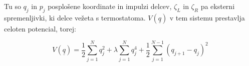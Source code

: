 \documentclass[a4paper]{article}
\newcommand{\half}{\frac{1}{2}}
\newcommand{\q}{\underline{q}}
\begin{document}
    Tu so $q_j$ in $p_j$ posplošene koordinate in impulzi delcev, $\zeta_L$ in $\zeta_R$ pa eksterni spremenljivki, ki
    delce vežeta s termostatoma. $V(\q)$ v tem sistemu prestavlja celoten potencial, torej:

    \begin{equation}\label{eq4}
        V(\q) = \half \sum_{j=1}^N q_j^2 + \lambda \sum_{j=1}^N q_j^4 + \half \sum_{j=1}^{N-1} (q_{j+1} - q_j)^2
    \end{equation}

    \iffalse
    \begin{figure}
        \centering
        \texttt{[image: slika1.pdf]}
        \caption{Avtokorelacijska funkcija spinskega toka.}
        \label{slika1}
    \end{figure}
    \fi
\end{document}
